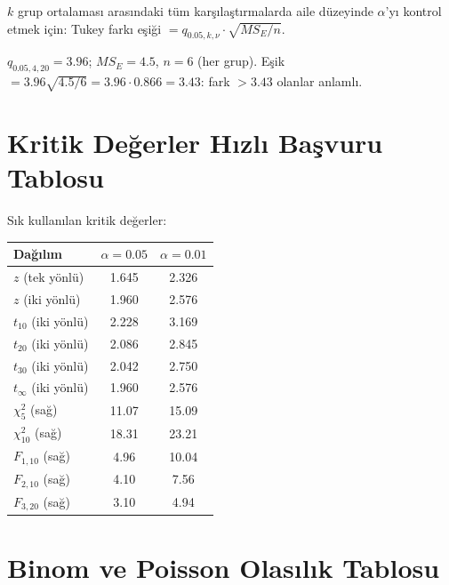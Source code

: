 $k$ grup ortalaması arasındaki tüm karşılaştırmalarda aile düzeyinde $\alpha$'yı kontrol etmek için:
Tukey farkı eşiği $= q_{0.05,k,\nu}\cdot\sqrt{MS_E/n}$.

\begin{ornek}[Tukey HSD, $k=4$, $\nu=20$]
$q_{0.05,4,20}=3.96$; $MS_E=4.5$, $n=6$ (her grup).
Eşik $=3.96\sqrt{4.5/6}=3.96\cdot0.866=3.43$: fark $>3.43$ olanlar anlamlı.
\end{ornek}

\section{Kritik Değerler Hızlı Başvuru Tablosu}
\label{app:kritik_ozet}

Sık kullanılan kritik değerler:

\begin{center}
\renewcommand{\arraystretch}{1.3}
\begin{tabular}{lcc}
\hline
\textbf{Dağılım} & \textbf{$\alpha=0.05$} & \textbf{$\alpha=0.01$} \\
\hline
$z$ (tek yönlü) & 1.645 & 2.326 \\
$z$ (iki yönlü) & 1.960 & 2.576 \\
$t_{10}$ (iki yönlü) & 2.228 & 3.169 \\
$t_{20}$ (iki yönlü) & 2.086 & 2.845 \\
$t_{30}$ (iki yönlü) & 2.042 & 2.750 \\
$t_\infty$ (iki yönlü) & 1.960 & 2.576 \\
$\chi^2_{5}$ (sağ) & 11.07 & 15.09 \\
$\chi^2_{10}$ (sağ) & 18.31 & 23.21 \\
$F_{1,10}$ (sağ) & 4.96 & 10.04 \\
$F_{2,10}$ (sağ) & 4.10 & 7.56 \\
$F_{3,20}$ (sağ) & 3.10 & 4.94 \\
\hline
\end{tabular}
\end{center}

\section{Binom ve Poisson Olasılık Tablosu}
\label{app:binom_pois_tablo}

